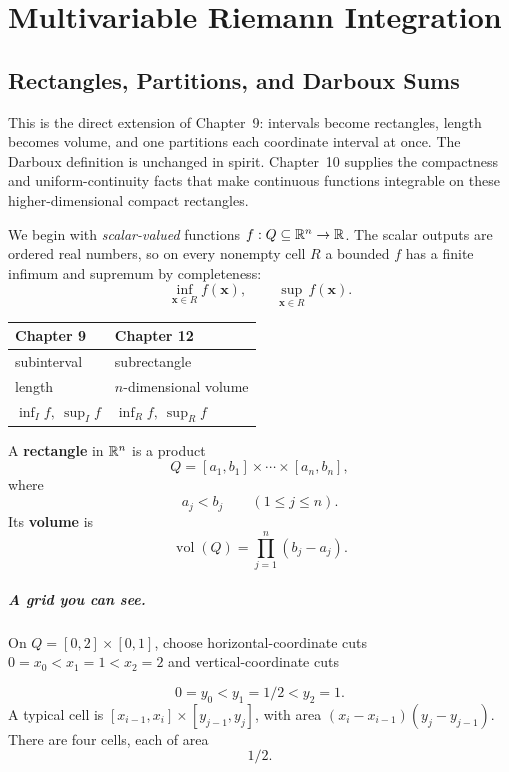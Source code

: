\chapter{Multivariable Riemann Integration}
\label{ch:multivariable-integration}

\section{Rectangles, Partitions, and Darboux Sums}

This is the direct extension of Chapter~9: intervals become rectangles,
length becomes volume, and one partitions each coordinate interval at once.
The Darboux definition is unchanged in spirit.  Chapter~10 supplies the
compactness and uniform-continuity facts that make continuous functions
integrable on these higher-dimensional compact rectangles.

We begin with \emph{scalar-valued} functions $f:Q\subseteq\mathbb{R}^n\to\mathbb{R}$.
The scalar outputs are ordered real numbers, so on every nonempty cell
$R$ a bounded $f$ has a finite infimum and supremum by completeness:
\[
\inf_{\mathbf{x}\in R}f(\mathbf{x}),\qquad
\sup_{\mathbf{x}\in R}f(\mathbf{x}).
\]
\begin{center}
\begin{tabular}{ll}
Chapter 9 & Chapter 12\\\hline
subinterval & subrectangle\\
length & $n$-dimensional volume\\
$\inf_I f,\ \sup_I f$ & $\inf_R f,\ \sup_R f$
\end{tabular}
\end{center}

\begin{definition}
A \textbf{rectangle} in $\mathbb{R}^n$ is a product
\[
Q=[a_1,b_1]\times\cdots\times[a_n,b_n],
\]
where
\[
a_j<b_j
\qquad(1\leq j\leq n).
\]
Its \textbf{volume} is
\[
\operatorname{vol}(Q)=\prod_{j=1}^{n}(b_j-a_j).
\]
\end{definition}

\paragraph{A grid you can see.}
On $Q=[0,2]\times[0,1]$, choose horizontal-coordinate cuts
$0=x_0<x_1=1<x_2=2$ and vertical-coordinate cuts

\[
0=y_0<y_1=1/2<y_2=1.
\]
 A typical cell is
$[x_{i-1},x_i]\times[y_{j-1},y_j]$, with area
$(x_i-x_{i-1})(y_j-y_{j-1})$. There are four cells, each of area
\[
1/2.
\]

